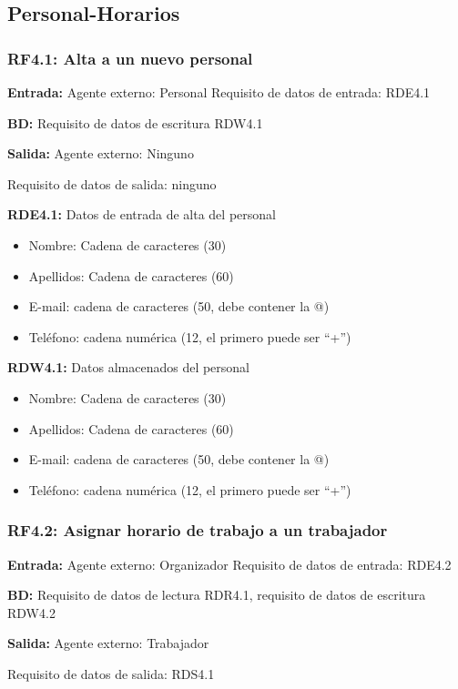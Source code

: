\subsection{Personal-Horarios}
\subsubsection{RF4.1: Alta a un nuevo personal}

\textbf{Entrada:} Agente externo: Personal            Requisito de datos de entrada: RDE4.1

\textbf{BD:} Requisito de datos de escritura RDW4.1

\textbf{Salida:} Agente externo: Ninguno

Requisito de datos de salida: ninguno

\textbf{RDE4.1:} Datos de entrada de alta del personal
\begin{itemize}
	\item Nombre: Cadena de caracteres (30)
	\item Apellidos: Cadena de caracteres (60)
	\item E-mail: cadena de caracteres (50, debe contener la @)
	\item Teléfono: cadena numérica (12, el primero puede ser ``+'')
\end{itemize}

\textbf{RDW4.1:} Datos almacenados del personal
\begin{itemize}
	\item Nombre: Cadena de caracteres (30)
	\item Apellidos: Cadena de caracteres (60)
	\item E-mail: cadena de caracteres (50, debe contener la @)
	\item Teléfono: cadena numérica (12, el primero puede ser ``+'')
\end{itemize}

\subsubsection{RF4.2: Asignar horario de trabajo a un trabajador}

\textbf{Entrada:} Agente externo: Organizador         Requisito de datos de entrada: RDE4.2

\textbf{BD:} Requisito de datos de lectura RDR4.1, requisito de datos de escritura RDW4.2

\textbf{Salida:} Agente externo: Trabajador

Requisito de datos de salida: RDS4.1

